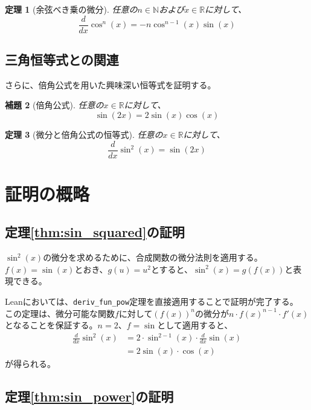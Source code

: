 \documentclass[uplatex, a4paper]{jlreq}
\newtheorem{theorem}{定理}[section]
\newtheorem{lemma}[theorem]{補題}
\begin{document}
\begin{theorem}[余弦べき乗の微分]\label{thm:cos_power}
任意の$n \in \mathbb{N}$および$x \in \mathbb{R}$に対して、
\[
    \frac{d}{dx}\cos^n(x) = -n\cos^{n-1}(x)\sin(x)
\]
\end{theorem}

\subsection{三角恒等式との関連}

さらに、倍角公式を用いた興味深い恒等式を証明する。

\begin{lemma}[倍角公式]\label{lem:double_angle}
任意の$x \in \mathbb{R}$に対して、
\[
    \sin(2x) = 2\sin(x)\cos(x)
\]
\end{lemma}

\begin{theorem}[微分と倍角公式の恒等式]\label{thm:identity}
任意の$x \in \mathbb{R}$に対して、
\[
    \frac{d}{dx}\sin^2(x) = \sin(2x)
\]
\end{theorem}

\section{証明の概略}

\subsection{定理\ref{thm:sin_squared}の証明}

$\sin^2(x)$の微分を求めるために、合成関数の微分法則を適用する。
$f(x) = \sin(x)$とおき、$g(u) = u^2$とすると、$\sin^2(x) = g(f(x))$と表現できる。

Leanにおいては、\texttt{deriv\_fun\_pow}定理を直接適用することで証明が完了する。
この定理は、微分可能な関数$f$に対して$(f(x))^n$の微分が$n \cdot f(x)^{n-1} \cdot f'(x)$
となることを保証する。$n=2$、$f = \sin$として適用すると、
\begin{align}
    \frac{d}{dx}\sin^2(x) &= 2 \cdot \sin^{2-1}(x) \cdot \frac{d}{dx}\sin(x) \\
    &= 2\sin(x) \cdot \cos(x)
\end{align}
が得られる。

\subsection{定理\ref{thm:sin_power}の証明}
\end{document}
